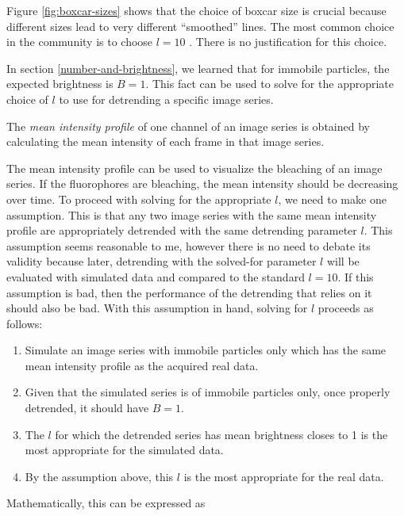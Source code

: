 \documentclass[12pt,]{book}
\providecommand{\tightlist}{%
  \setlength{\itemsep}{0pt}\setlength{\parskip}{0pt}}
\theoremstyle{definition}
\theoremstyle{definition}
\theoremstyle{definition}
\theoremstyle{remark}
\let\BeginKnitrBlock\begin \let\EndKnitrBlock\end
\begin{document}
Figure \ref{fig:boxcar-sizes} shows that the choice of boxcar size is
crucial because different sizes lead to very different ``smoothed''
lines. The most common choice in the community is to choose \(l = 10\)
\citep{SimFCS}. There is no justification for this choice.

In section \ref{number-and-brightness}, we learned that for immobile
particles, the expected brightness is \(B = 1\). This fact can be used
to solve for the appropriate choice of \(l\) to use for detrending a
specific image series.

\BeginKnitrBlock{definition}
\protect\hypertarget{def:unnamed-chunk-32}{}{\label{def:unnamed-chunk-32}
}The \emph{mean intensity profile} of one channel of an image series is
obtained by calculating the mean intensity of each frame in that image
series.
\EndKnitrBlock{definition}

The mean intensity profile can be used to visualize the bleaching of an
image series. If the fluorophores are bleaching, the mean intensity
should be decreasing over time. To proceed with solving for the
appropriate \(l\), we need to make one assumption. This is that any two
image series with the same mean intensity profile are appropriately
detrended with the same detrending parameter \(l\). This assumption
seems reasonable to me, however there is no need to debate its validity
because later, detrending with the solved-for parameter \(l\) will be
evaluated with simulated data and compared to the standard \(l = 10\).
If this assumption is bad, then the performance of the detrending that
relies on it should also be bad. With this assumption in hand, solving
for \(l\) proceeds as follows:

\begin{enumerate}
\def\labelenumi{\arabic{enumi}.}
\tightlist
\item
  Simulate an image series with immobile particles only which has the
  same mean intensity profile as the acquired real data.
\item
  Given that the simulated series is of immobile particles only, once
  properly detrended, it should have \(B = 1\).
\item
  The \(l\) for which the detrended series has mean brightness closes to
  1 is the most appropriate for the simulated data.
\item
  By the assumption above, this \(l\) is the most appropriate for the
  real data.
\end{enumerate}

Mathematically, this can be expressed as
\end{document}
